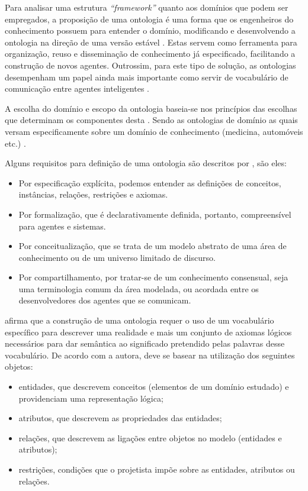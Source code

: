 \documentclass[portuguese]{textolivre}
\begin{document}
Para analisar uma estrutura \textit{“framework”} quanto aos domínios que podem ser empregados, a proposição de uma ontologia é uma forma que os engenheiros do conhecimento possuem para entender o domínio, modificando e desenvolvendo a ontologia na direção de uma versão estável \cite{rautenberg2008}. Estas servem como ferramenta para organização, reuso e disseminação de conhecimento já especificado, facilitando a construção de novos agentes. Outrossim, para este tipo de solução, as ontologias desempenham um papel ainda mais importante como servir de vocabulário de comunicação entre agentes inteligentes \cite[p. 4]{freitas2004}.

A escolha do domínio e escopo da ontologia baseia-se nos princípios das escolhas que determinam os componentes desta \cite{campos2007}. Sendo as ontologias de domínio as quais versam especificamente sobre um domínio de conhecimento (medicina, automóveis etc.) \cite{almeida2013}.

Alguns requisitos para definição de uma ontologia são descritos por \textcite[p. 15]{freitas2004}, são eles:

\medskip
\begin{itemize}
    \item Por especificação explícita, podemos entender as definições de conceitos, instâncias, relações, restrições e axiomas.
    \item Por formalização, que é declarativamente definida, portanto, compreensível para agentes e sistemas.
    \item Por conceitualização, que se trata de um modelo abstrato de uma área de conhecimento ou de um universo limitado de discurso.
    \item Por compartilhamento, por tratar-se de um conhecimento consensual, seja uma terminologia comum da área modelada, ou acordada entre os desenvolvedores dos agentes que se comunicam.
\end{itemize}
\medskip

 afirma que a construção de uma ontologia requer o uso de um vocabulário específico para descrever uma realidade e mais um conjunto de axiomas lógicos necessários para dar semântica ao significado pretendido pelas palavras desse vocabulário. De acordo com a autora, deve se basear na utilização dos seguintes objetos:
 \medskip 
\begin{itemize}
    \item entidades, que descrevem conceitos (elementos de um domínio estudado) e providenciam uma representação lógica;
    \item atributos, que descrevem as propriedades das entidades;
    \item relações, que descrevem as ligações entre objetos no modelo (entidades e atributos);
    \item restrições, condições que o projetista impõe sobre as entidades, atributos ou relações.
\end{itemize}
 \medskip 
 
\end{document}
